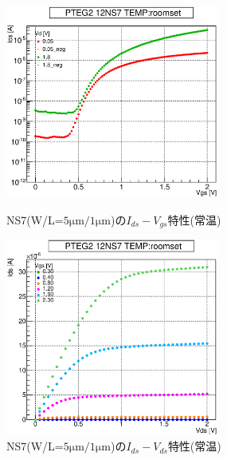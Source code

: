 				\begin{figure}[htbp]
					\begin{minipage}{0.5\hsize}
						\begin{center}
							\includegraphics[width=70mm]{./Chapter/Appendix/Picture/NST/NS7/PTEG2_12_NS7_IdVg_roomset.eps}
						\end{center}
						\caption{NS7(W/L=$5\mathrm{\mu m}/1\mathrm{\mu m}$)の$I_{ds}-V_{gs}$特性(常温)}
						\label{fig:NS7_IdVg_room}
					\end{minipage}
					\begin{minipage}{0.5\hsize}
						\begin{center}
							\includegraphics[width=70mm]{./Chapter/Appendix/Picture/NST/NS7/PTEG2_12_NS7_IdVd_roomset.eps}
						\end{center}
						\caption{NS7(W/L=$5\mathrm{\mu m}/1\mathrm{\mu m}$)の$I_{ds}-V_{ds}$特性(常温)}
						\label{fig:NS7_IdVd_room}
					\end{minipage}
				\end{figure}
